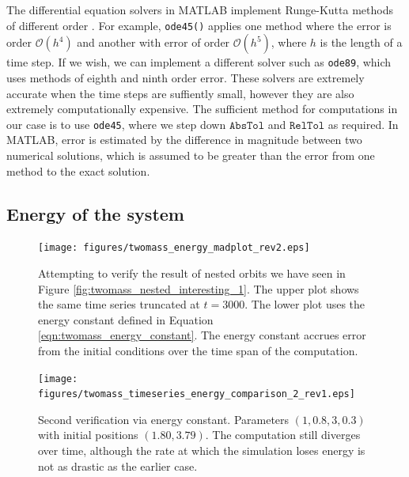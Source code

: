 The differential equation solvers in MATLAB implement Runge-Kutta methods of different order \cite{moler_2014}.
For example, \texttt{ode45()} applies one method where the error is order $\mathcal{O}(h^4)$ and another with error of order $\mathcal{O}(h^5)$, where $h$ is the length of a time step.
If we wish, we can implement a different solver such as \texttt{ode89},
which uses methods of eighth and ninth order error.
These solvers are extremely accurate when the time steps are suffiently small,
however they are also extremely computationally expensive.
The sufficient method for computations in our case is to use \texttt{ode45},
where we step down $\mathtt{AbsTol}$ and $\mathtt{RelTol}$ as required.
In MATLAB, error is estimated by the difference in magnitude between two numerical solutions,
which is assumed to be greater than the error from one method to the exact solution. 




\subsection{Energy of the system}

\begin{figure}[h!]
    \centering
    \texttt{[image: figures/twomass\_energy\_madplot\_rev2.eps]}
    \caption{
        Attempting to verify the result of nested orbits we have seen in Figure \ref{fig:twomass_nested_interesting_1}.
        The upper plot shows the same time series truncated at $t=3000$.
        The lower plot uses the energy constant defined in Equation \ref{eqn:twomass_energy_constant}.
        The energy constant accrues error from the initial conditions over the time span of the computation.
    }
    \label{fig:twomass_energy_madplot}
\end{figure}

\begin{figure}[h!]
    \centering
    \texttt{[image: figures/twomass\_timeseries\_energy\_comparison\_2\_rev1.eps]}
    \caption{
        Second verification via energy constant.
        Parameters \((1, 0.8, 3, 0.3)\) with initial positions \((1.80, 3.79)\).
        The computation still diverges over time,
        although the rate at which the simulation loses energy is not as drastic as the earlier case.
    }
    \label{fig:twomass_energy_2}  %
\end{figure}

